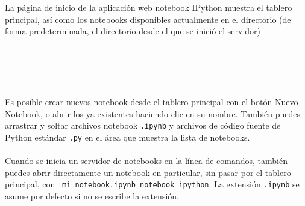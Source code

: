 \documentclass[12pt]{article}
\begin{document}
\\
\\
La página de inicio de la aplicación web notebook IPython muestra el tablero principal, así como los notebooks disponibles actualmente en el directorio (de forma predeterminada, el directorio desde el que se inició el servidor) 
\\
\\
\\
\\
\\
\\
Es posible crear nuevos notebook desde el tablero principal con el botón Nuevo Notebook, o abrir los ya existentes haciendo clic en su nombre. También puedes arrastrar y soltar archivos notebook \texttt{.ipynb} y archivos de código fuente de Python estándar \texttt{.py} en el área que muestra la lista de notebooks. 
\\
\\
Cuando se inicia un servidor de notebooks en la línea de comandos, también puedes abrir directamente un notebook en particular, sin pasar por el tablero principal, con \texttt{ mi\_notebook.ipynb notebook ipython}. La extensión \texttt{.ipynb} se asume por defecto si no se escribe la extensión.
\end{document}
